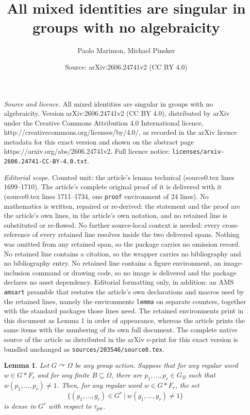 \documentclass[10pt,a4paper]{amsart}
\title{All mixed identities are singular in groups with no algebraicity}
\author{Paolo Marimon, Michael Pinsker}
\date{Source: arXiv:2606.24741v2 (CC BY 4.0)}
\newtheorem{lemma}{Lemma}
\def\acts{\curvearrowright}
\DeclareMathOperator{\ppww}{pw}
\newcommand{\pw}{\tau_{\ppww}}
\newcommand{\pwom}{\tau_{\ppww}^{\spOm}}
\newcommand{\spOm}{\bm{\Omega}}
\begin{document}
\maketitle

\noindent\emph{Source and licence.} All mixed identities are singular in groups with no algebraicity. Version arXiv:2606.24741v2 (CC BY 4.0), distributed by arXiv under the Creative Commons Attribution 4.0 International licence, http://creativecommons.org/licenses/by/4.0/, as recorded in the arXiv licence metadata for this exact version and shown on the abstract page https://arxiv.org/abs/2606.24741v2. Full licence notice: \texttt{licenses/arxiv-2606.24741-CC-BY-4.0.txt}.\par\smallskip

\noindent\textit{Editorial scope.} Counted unit: the article's lemma technical (source0.tex lines 1699--1710). The article's complete original proof of it is delivered with it (source0.tex lines 1711--1734, one \texttt{proof} environment of 24 lines). No mathematics is written, repaired or re-derived: the statement and the proof are the article's own lines, in the article's own notation, and no retained line is substituted or re-flowed.  No further source-local context is needed: every cross-reference of every retained line resolves inside the two delivered spans.  Nothing was omitted from any retained span, so the package carries no omission record.  No retained line contains a citation, so the wrapper carries no bibliography and no bibliography entry.  No retained line contains a figure environment, an image-inclusion command or drawing code, so no image is delivered and the package declares no asset dependency.  Editorial formatting only, in addition: an AMS \texttt{amsart} preamble that restates the article's own declarations and macros used by the retained lines, namely the environments \texttt{lemma} on separate counters, together with the standard packages those lines need.  The retained environments print in this document as Lemma 1 in order of appearance, whereas the article prints the same items with the numbering of its own full document.  The complete native source of the article as distributed in the arXiv e-print for this exact version is bundled unchanged as \texttt{sources/203546/source0.tex}.
\begin{lemma}\label{lemma:slightly technical} 
Let $G\acts\Omega$ be any group action. 
Suppose that for any regular word ${w}\in G* F_r$ and for any finite $B\subseteq \Omega$, there are $p_1, \dots, p_r\in G_B$ such that ${w}(p_1, \dots, p_r)\neq 1$. Then, for any regular word $w\in G* F_r$, the set 
\begin{equation}\label{eq:thesolutionset}
   \{ (g_1, \dots, g_r)\in G^r\ \vert\ w(g_1, \dots, g_r){\neq} 1\}\; 
\end{equation}
{is dense in $G^r$ with respect to $\pw$.}
\end{lemma}
\end{document}
